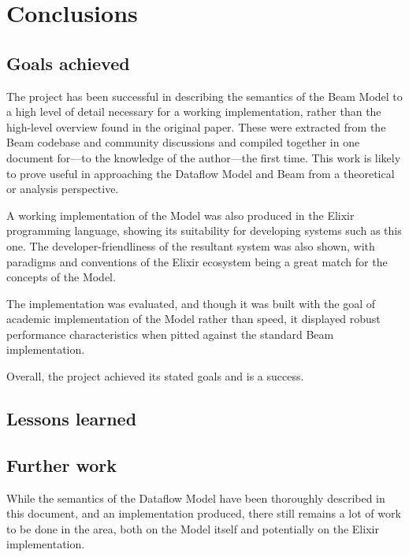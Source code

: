 \chapter{Conclusions}\label{ch:concl}
\section{Goals achieved}\label{sec:concl:goals}

The project has been successful in describing the semantics of the Beam Model to a high level of detail necessary for a working implementation, rather than the high-level overview found in the original paper.
These were extracted from the Beam codebase and community discussions and compiled together in one document for---to the knowledge of the author---the first time.
This work is likely to prove useful in approaching the Dataflow Model and Beam from a theoretical or analysis perspective.

A working implementation of the Model was also produced in the Elixir programming language, showing its suitability for developing systems such as this one.
The developer-friendliness of the resultant system was also shown, with paradigms and conventions of the Elixir ecosystem being a great match for the concepts of the Model.

The implementation was evaluated, and though it was built with the goal of academic implementation of the Model rather than speed, it displayed robust performance characteristics when pitted against the standard Beam implementation.

Overall, the project achieved its stated goals and is a success.

\section{Lessons learned}\label{sec:concl:lessons}
\section{Further work}\label{sec:concl:further}

While the semantics of the Dataflow Model have been thoroughly described in this document, and an implementation produced, there still remains a lot of work to be done in the area, both on the Model itself and potentially on the Elixir implementation.

